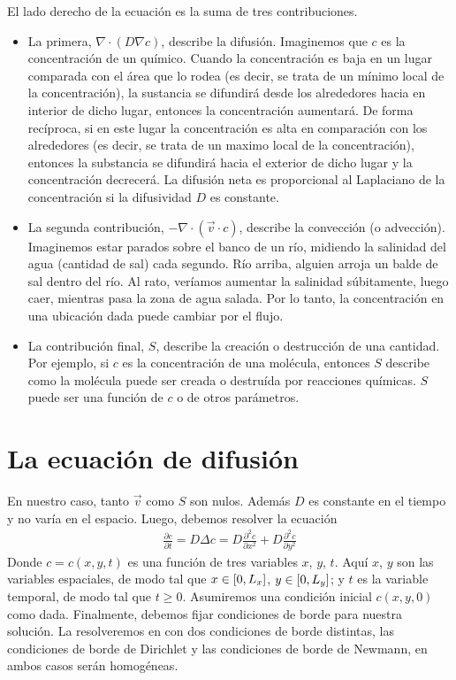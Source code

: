 \documentclass{article}
\newcommand{\leftOpenInterval}{\left]}
\newcommand{\rightOpenInterval}{\right[}
\newcommand{\leftClosedInterval}{\left[}
\newcommand{\rightClosedInterval}{\right]}
\newcommand{\interval}[3]{%
  \ifstrequal{#1}{oo}{%
    \leftOpenInterval #2, #3 \rightOpenInterval%
  }{%
    \ifstrequal{#1}{co}{%
      \leftClosedInterval #2, #3 \rightOpenInterval%
    }{%
      \ifstrequal{#1}{oc}{
        \leftOpenInterval #2, #3 \rightClosedInterval%
      }{%
        \ifstrequal{#1}{cc}{
          \leftClosedInterval #2, #3 \rightClosedInterval
        }{%
        }%
      }%
    }%
  }%
}
\begin{document}
  El lado derecho de la ecuación es la suma de tres contribuciones.
  \begin{itemize}
    \item La primera, \(\nabla \cdot (D \nabla c)\), describe la difusión.
    Imaginemos que \(c\) es la concentración de un químico.
    Cuando la concentración es baja en un lugar comparada con el área que lo rodea (es decir, se trata de un mínimo local de la concentración), la sustancia se difundirá desde los alrededores hacia en interior de dicho lugar, entonces la concentración aumentará.
    De forma recíproca, si en este lugar la concentración es alta en comparación con los alrededores (es decir, se trata de un maximo local de la concentración), entonces la substancia se difundirá hacia el exterior de dicho lugar y la concentración decrecerá.
    La difusión neta es proporcional al Laplaciano de la concentración si la difusividad \(D\) es constante.
    \item La segunda contribución, \(- \nabla \cdot (\vec{v} \cdot c)\), describe la convección (o advección).
    Imaginemos estar parados sobre el banco de un río, midiendo la salinidad del agua (cantidad de sal) cada segundo.
    Río arriba, alguien arroja un balde de sal dentro del río.
    Al rato, veríamos aumentar la salinidad súbitamente, luego caer, mientras pasa la zona de agua salada.
    Por lo tanto, la concentración en una ubicación dada puede cambiar por el flujo.
    \item La contribución final, \(S\), describe la creación o destrucción de una cantidad.
    Por ejemplo, si \(c\) es la concentración de una molécula, entonces \(S\) describe como la molécula puede ser creada o destruída por reacciones químicas.
    \(S\) puede ser una función de \(c\) o de otros parámetros.
  \end{itemize}

  \section{La ecuación de difusión}
  En nuestro caso, tanto \(\vec{v}\) como \(S\) son nulos.
  Además \(D\) es constante en el tiempo y no varía en el espacio.
  Luego, debemos resolver la ecuación
  \begin{align}
    \label{equation:diffusion}
    \frac{\partial c}{\partial t}
    =
    D \Delta c
    =
    D \frac{\partial^2 c}{\partial x^2} + D \frac{\partial^2 c}{\partial y^2}
  \end{align}
  Donde \(c = c(x, y, t)\) es una función de tres variables \(x\), \(y\), \(t\).
  Aquí \(x\), \(y\) son las variables espaciales, de modo tal que \(x \in \interval{cc}{0}{L_x}\), \(y \in \interval{cc}{0}{L_y}\);
  y \(t\) es la variable temporal, de modo tal que \(t \geq 0\).
  Asumiremos una condición inicial \(c(x, y, 0)\) como dada.
  Finalmente, debemos fijar condiciones de borde para nuestra solución.
  La resolveremos en con dos condiciones de borde distintas, las condiciones de borde de Dirichlet y las condiciones de borde de Newmann, en ambos casos serán homogéneas.
\end{document}
